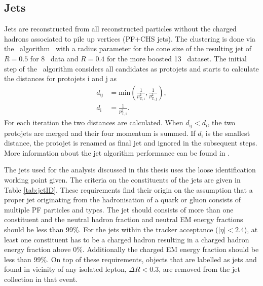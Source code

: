 \subsection{Jets}
Jets are reconstructed  from all reconstructed particles without the charged hadrons associated to pile up vertices (PF+CHS jets). The clustering is done via the \antikt\ algorithm~\cite{Cacciari:2008gp} with a radius parameter for the cone size of the resulting jet of $R=0.5$ for 8 \TeV\ data and $R=0.4$ for the more boosted 13 \TeV\ dataset. The initial step of the \antikt\ algorithm considers all candidates as protojets and starts to calculate the distances for protojets i and j as
\begin{equation}
\begin{aligned}
   d_{\mathrm{ij}} &= \mathrm{min}\left(\frac{1}{p_{\mathrm{T,i}}^2}, \frac{1}{p_{\mathrm{T,j}}^2}\right), \\
   d_{\mathrm{i}} &= \frac{1}{p_{\mathrm{T,i}}^2}.
 \end{aligned}
\end{equation}
For each iteration the two distances are calculated. When $d_{\mathrm{ij}} < d_{\mathrm{i}}$, the two protojets are merged and their four momentum is summed. If $d_{\mathrm{i}}$ is the smallest distance, the protojet is renamed as final jet and ignored in the subsequent steps. More information about the jet algorithm performance can be found in \cite{CMS-PAS-JME-16-003}.

The jets used for the analysis discussed in this thesis uses the loose identification working point given. The criteria on the constituents of the jets are given in Table \ref{tab:jetID}. These requirements find their origin on the assumption that a proper jet originating from the hadronisation of a quark or gluon consists of multiple PF particles and types. The jet should consists of more than one constituent and the neutral hadron fraction and neutral EM energy fractions should be less than 99\%. For the jets within the tracker acceptance ($|\eta|<2.4$), at least one constituent has to be a charged hadron resulting in a charged hadron energy fraction above 0\%. Additionally the charged EM energy fraction should be less than 99\%. On top of these requirements, objects that are labelled as jets and found in vicinity of any isolated lepton, $\Delta R < 0.3$, are removed from the jet collection in that event. 

